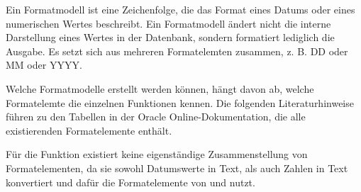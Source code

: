           \begin{merke}
            Ein Formatmodell ist eine Zeichenfolge, die das Format eines Datums oder eines numerischen Wertes beschreibt. Ein Formatmodell ändert nicht die interne Darstellung eines Wertes in der Datenbank, sondern formatiert lediglich die Ausgabe. Es setzt sich aus mehreren Formatelemten zusammen, z. B. DD oder MM oder YYYY.
          \end{merke}
          Welche Formatmodelle erstellt werden können, hängt davon ab, welche Formatelemte die einzelnen Funktionen kennen. Die folgenden Literaturhinweise führen zu den Tabellen in der Oracle Online-Dokumentation, die alle existierenden Formatelemente enthält.
          \begin{literaturinternet}
            \item \cite{i34570}
            \item \cite{i34924}
          \end{literaturinternet}

          \begin{merke}
            Für die Funktion  existiert keine eigenständige Zusammenstellung von Formatelementen, da sie sowohl Datumswerte in Text, als auch Zahlen in Text konvertiert und dafür die Formatelemente von  und  nutzt.
          \end{merke}
